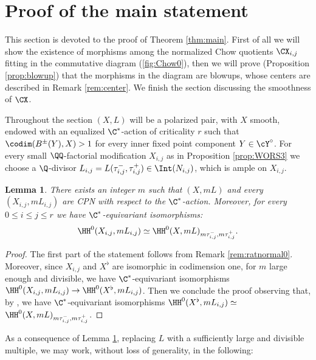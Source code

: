 \documentclass[reqno]{amsproc}
\newtheorem{lemma}[theorem]{Lemma}
\theoremstyle{definition}
\begin{document}
\section{Proof of the main statement}\label{sec:main}

This section is devoted to the proof of Theorem \ref{thm:main}. First of all we will show the existence of morphisms among the normalized Chow quotients $\CX_{i,j}$ fitting in the commutative diagram (\ref{fig:Chow0}), then we will prove (Proposition \ref{prop:blowup}) that the morphisms in the diagram are blowups, whose centers are described in Remark \ref{rem:center}. We finish the section discussing the smoothness of $\CX$. 

Throughout the section $(X,L)$ will  be a polarized pair, with $X$ smooth, endowed with an equalized $\C^*$-action of criticality $r$ such that  $\codim(B^\pm(Y),X)>1$ for every inner fixed point component $Y\in\cY^\circ$. 
For every small $\QQ$-factorial modification $X_{i,j}$ as in Proposition \ref{prop:WORS3} we choose a $\Q$-divisor $L_{i,j}=L(\tau_{i,j}^-,\tau_{i,j}^+) \in\Int(N_{i,j})$, which is  ample on $X_{i,j}$.


\begin{lemma}\label{lem:manyCPNs}
There exists an integer $m$ such that $(X,mL)$ and every $(X_{i,j},mL_{i,j})$ are CPN  with respect to the $\C^*$-action. Moreover, for every $0 \le i \le j\le r$ we have $\C^*$-equivariant isomorphisms:
$$
\HH^0(X_{i,j},mL_{i,j})\simeq \HH^0(X,mL)_{m\tau_{i,j}^-,m\tau_{i,j}^+}.
$$  
\end{lemma}

\begin{proof}
The first part of the statement follows from Remark \ref{rem:ratnormal0}. Moreover, since $X_{i,j}$ and $X^\flat$ are isomorphic in codimension one, for $m$ large enough and divisible, we have $\C^*$-equivariant isomorphisms $\HH^0(X_{i,j},mL_{i,j})\to \HH^0(X^\flat,mL_{i,j})$. Then we conclude the proof observing that,  by \cite[Lemma~2.5]{WORS3}, we have $\C^*$-equivariant isomorphisms $\HH^0(X^\flat,mL_{i,j})\simeq $ $\HH^0(X,mL)_{m\tau_{i,j}^-,m\tau_{i,j}^+}$.
\end{proof}

As a consequence of  Lemma \ref{lem:manyCPNs}, replacing $L$ with a sufficiently large and divisible multiple, we may work, without loss of generality, in the following: 
\end{document}
